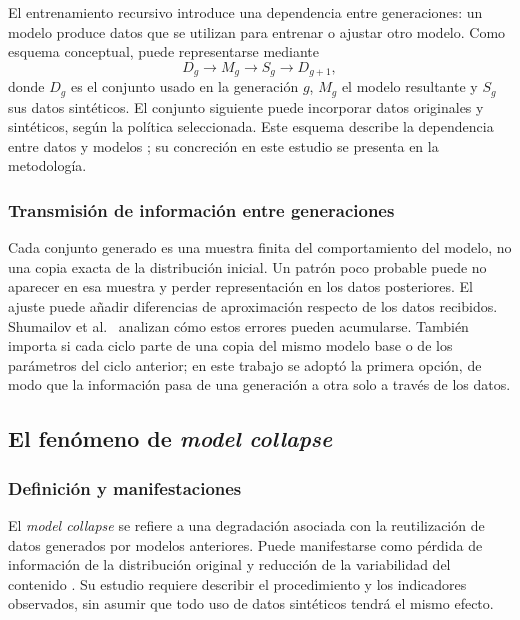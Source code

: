\documentclass[12pt,letterpaper]{article}
\begin{document}
El entrenamiento recursivo introduce una dependencia entre generaciones:
un modelo produce datos que se utilizan para entrenar o ajustar otro modelo.
Como esquema conceptual, puede representarse mediante
\begin{equation}
    D_g \longrightarrow M_g \longrightarrow S_g
    \longrightarrow D_{g+1},
\end{equation}
donde \(D_g\) es el conjunto usado en la generación \(g\), \(M_g\) el modelo
resultante y \(S_g\) sus datos sintéticos. El conjunto siguiente puede
incorporar datos originales y sintéticos, según la política seleccionada.
Este esquema describe la dependencia entre datos y modelos
\cite{shumailov2024,kazdan2025}; su concreción en este estudio se presenta
en la metodología.

\subsubsection{Transmisión de información entre generaciones}

Cada conjunto generado es una muestra finita del comportamiento del modelo,
no una copia exacta de la distribución inicial. Un patrón poco probable
puede no aparecer en esa muestra y perder representación en los datos
posteriores. El ajuste puede añadir diferencias de aproximación respecto
de los datos recibidos. Shumailov et al.\ \cite{shumailov2024} analizan cómo
estos errores pueden acumularse. También importa si cada ciclo parte de
una copia del mismo modelo base o de los parámetros del ciclo anterior; en
este trabajo se adoptó la primera opción, de modo que la información pasa
de una generación a otra solo a través de los datos.

\subsection{El fenómeno de \textit{model collapse}}

\subsubsection{Definición y manifestaciones}

El \textit{model collapse} se refiere a una degradación asociada con la
reutilización de datos generados por modelos anteriores. Puede manifestarse
como pérdida de información de la distribución original y reducción de
la variabilidad del contenido \cite{shumailov2024}. Su estudio requiere
describir el procedimiento y los indicadores observados, sin asumir que
todo uso de datos sintéticos tendrá el mismo efecto.
\end{document}
